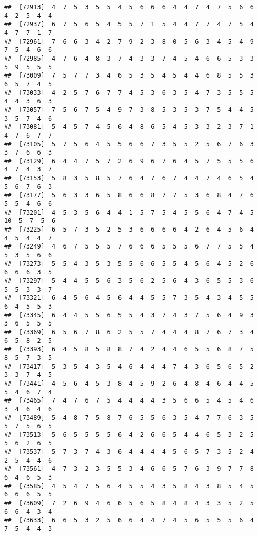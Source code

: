 \documentclass[
]{book}
\begin{document}
\begin{verbatim}
##  [72913]  4  7  5  3  5  5  4  5  6  6  6  4  4  7  4  7  5  6  6  4  2  5  4  4
##  [72937]  6  7  5  6  5  4  5  5  7  1  5  4  4  7  7  4  7  5  4  4  7  7  1  7
##  [72961]  7  6  6  3  4  2  7  9  2  3  8  0  5  6  3  4  5  4  9  7  5  4  6  6
##  [72985]  4  7  6  4  8  3  7  4  3  3  7  4  5  4  6  6  5  3  3  5  9  5  5  5
##  [73009]  7  5  7  7  3  4  6  5  3  5  4  5  4  4  6  8  5  5  3  6  5  7  4  5
##  [73033]  4  2  5  7  6  7  7  4  5  3  6  3  5  4  7  3  5  5  5  4  4  3  6  3
##  [73057]  7  5  6  7  5  4  9  7  3  8  5  3  5  3  7  5  4  4  5  3  5  7  4  6
##  [73081]  5  4  5  7  4  5  6  4  8  6  5  4  5  3  3  2  3  7  1  4  7  6  7  7
##  [73105]  5  7  5  6  4  5  5  6  6  7  3  5  5  2  5  6  7  6  3  3  7  6  6  3
##  [73129]  6  4  4  7  5  7  2  6  9  6  7  6  4  5  7  5  5  5  6  4  7  4  3  7
##  [73153]  5  8  3  5  8  5  7  6  4  7  6  7  4  4  7  4  6  5  4  5  6  7  6  3
##  [73177]  5  6  3  3  6  5  8  6  6  8  7  7  5  3  6  8  4  7  6  5  5  4  6  6
##  [73201]  4  5  3  5  6  4  4  1  5  7  5  4  5  5  6  4  7  4  5 10  5  7  5  6
##  [73225]  6  5  7  3  5  2  5  3  6  6  6  6  4  2  6  4  5  6  4  4  5  4  4  7
##  [73249]  4  6  7  5  5  5  7  6  6  6  5  5  5  6  7  7  5  5  4  5  3  5  6  6
##  [73273]  5  5  4  3  5  3  5  5  6  6  5  5  4  5  6  4  5  2  6  6  6  6  3  5
##  [73297]  5  4  4  5  5  6  3  5  6  2  5  6  4  3  6  5  5  3  6  5  5  3  3  7
##  [73321]  6  4  5  6  4  5  6  4  4  5  5  7  3  5  4  3  4  5  5  6  4  5  5  3
##  [73345]  6  4  4  5  5  6  5  5  4  3  7  4  3  7  5  6  4  9  3  3  6  5  5  5
##  [73369]  6  5  6  7  8  6  2  5  5  7  4  4  4  8  7  6  7  3  4  6  5  8  2  5
##  [73393]  6  4  5  8  5  8  8  7  4  2  4  4  6  5  5  6  8  7  5  8  5  7  3  5
##  [73417]  5  3  5  4  3  5  4  6  4  4  4  7  4  3  6  5  6  5  2  3  3  7  4  5
##  [73441]  4  5  6  4  5  3  8  4  5  9  2  6  4  8  4  6  4  4  5  5  4  6  7  4
##  [73465]  7  4  7  6  7  5  4  4  4  4  3  5  6  6  5  4  5  4  6  3  4  6  4  6
##  [73489]  5  4  8  7  5  8  7  6  5  5  6  3  5  4  7  7  6  3  5  5  7  5  6  5
##  [73513]  5  6  5  5  5  5  6  4  2  6  6  5  4  4  6  5  3  2  5  5  6  2  6  5
##  [73537]  5  7  3  7  4  3  6  4  4  4  4  5  6  5  7  3  5  2  4  2  5  4  4  6
##  [73561]  4  7  3  2  3  5  5  3  4  6  6  5  7  6  3  9  7  7  8  6  4  6  5  3
##  [73585]  4  5  4  7  5  6  4  5  5  4  3  5  8  4  3  8  5  4  5  6  6  6  5  5
##  [73609]  7  2  6  9  4  6  6  5  6  5  8  4  8  4  3  3  5  2  5  6  6  4  3  4
##  [73633]  6  6  5  3  2  5  6  6  4  4  7  4  5  6  5  5  5  6  4  7  5  4  4  3

\end{verbatim}
\end{document}
